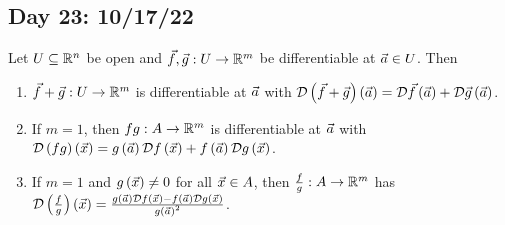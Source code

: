 \documentclass[main.tex]{subfiles}
\begin{document}
\subsection{Day 23: 10/17/22}
\begin{lemma}
    Let $U\subseteq \mathbb R^n$ be open and $\vec{f}, \vec{g} : U\to \mathbb R^m$ be differentiable at $\vec{a}\in U$. Then
    \begin{enumerate}
        \item $\vec{f} + \vec{g} : U\to \mathbb R^m$ is differentiable at $\vec{a}$ with $\mathcal{D}\left( \vec{f} + \vec{g} \right)\left( \vec{a} \right) = \mathcal{D}\vec{f}\left( \vec{a} \right) + \mathcal{D}\vec{g}\left( \vec{a} \right)$.
        \item If $m = 1$, then $fg : A\to \mathbb R^m$ is differentiable at $\vec{a}$ with $\mathcal{D}\left( fg \right)\left( \vec{x} \right) = g\left( \vec{a} \right)\mathcal{D}f\left( \vec{x} \right) + f\left( \vec{a} \right)\mathcal{D}g\left( \vec{x} \right)$.
        \item If $m = 1$ and $g\left( \vec{x} \right)\neq 0$ for all $\vec{x}\in A$, then $\frac{f}{g} : A\to \mathbb R^m$ has $\mathcal{D}\left( \frac{f}{g} \right)\left( \vec{x} \right) = \frac{g\left( \vec{a} \right)\mathcal{D}f\left( \vec{x} \right) - f\left( \vec{a} \right)\mathcal{D}g\left( \vec{x} \right)}{g\left( \vec{a} \right)^2}$.
    \end{enumerate}
\end{lemma}
\end{document}
